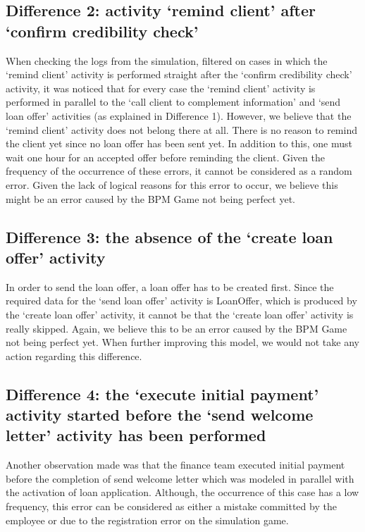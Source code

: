 \documentclass[a4paper]{article} %
\begin{document}
\subsection{Difference 2: activity ‘remind client’ after ‘confirm credibility check’}
When checking the logs from the simulation, filtered on cases in which the ‘remind client’ activity is performed straight after the ‘confirm credibility check’ activity, it was noticed that for every case the ‘remind client’ activity is performed in parallel to the ‘call client to complement information’ and ‘send loan offer’ activities (as explained in Difference 1). However, we believe that the ‘remind client’ activity does not belong there at all. There is no reason to remind the client yet since no loan offer has been sent yet. In addition to this, one must wait one hour for an accepted offer before reminding the client. Given the frequency of the occurrence of these errors, it cannot be considered as a random error. Given the lack of logical reasons for this error to occur, we believe this might be an error caused by the BPM Game not being perfect yet.

\subsection{Difference 3: the absence of the ‘create loan offer’ activity}
In order to send the loan offer, a loan offer has to be created first. Since the required data for the ‘send loan offer’ activity is LoanOffer, which is produced by the ‘create loan offer’ activity, it cannot be that the ‘create loan offer’ activity is really skipped. Again, we believe this to be an error caused by the BPM Game not being perfect yet. When further improving this model, we would not take any action regarding this difference.

\subsection{Difference 4: the ‘execute initial payment’ activity started before the ‘send welcome letter’ activity has been performed}
Another observation made was that the finance team executed initial payment before the completion of send welcome letter which was modeled in parallel with the activation of loan application. Although, the occurrence of this case has a low frequency, this error can be considered as either a mistake committed by the employee or due to the registration error on the simulation game.
\end{document}
